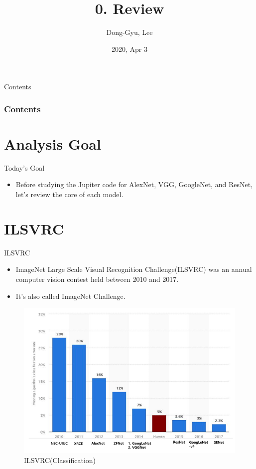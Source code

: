 \documentclass{beamer}
\title[Short title]{0. Review }
\author{Dong-Gyu, Lee}
\institute[] %
{
	Dept. of Statistics, KU%
\medskip
}
\date{2020, Apr 3} %
\begin{document}
\begin{frame}
\titlepage %
\end{frame}

\begin{frame}{Contents}
\frametitle{Contents}
	\tableofcontents 
\end{frame}

\section{Analysis Goal}
\begin{frame}{Today's Goal}
	\begin{itemize}
		\item Before studying the Jupiter code for AlexNet, VGG, GoogleNet, and ResNet, let's review the core of each model.
	\end{itemize}
\end{frame}


\section{ILSVRC}
\begin{frame}{ILSVRC}
	\begin{itemize}
		\item ImageNet Large Scale Visual Recognition Challenge(ILSVRC) was an annual computer vision contest held between 2010 and 2017.
		\item It's also called ImageNet Challenge.
	\end{itemize}
	\vspace{10pt}
	\begin{figure}[h]		
		\centering
		\includegraphics[scale=0.4]{./ilsvrc/ILSVRC.PNG}
		\caption{ILSVRC(Classification)}
		\label{ilsvrc}
	\end{figure}
\end{frame}
\end{document}

